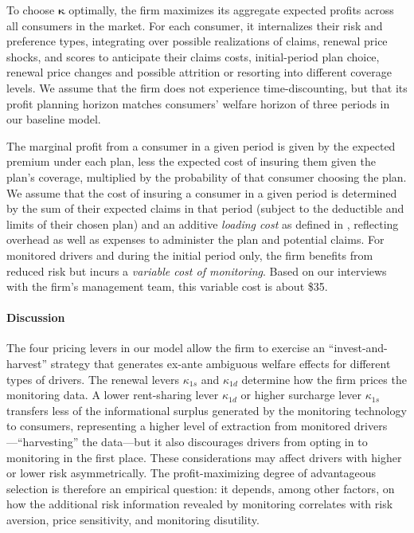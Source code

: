 To choose $\boldsymbol{\kappa}$ optimally, the firm maximizes its aggregate expected profits across all consumers in the market. For each consumer, it internalizes their risk and preference types, integrating over possible realizations of claims, renewal price shocks, and scores to anticipate their claims costs, initial-period plan choice, renewal price changes and possible attrition or resorting into different coverage levels. We assume that the firm does not experience time-discounting, but that its profit planning horizon matches consumers' welfare horizon of three periods in our baseline model.

The marginal profit from a consumer in a given period is given by the expected premium under each plan, less the expected cost of insuring them given the plan's coverage, multiplied by the probability of that consumer choosing the plan. We assume that the cost of insuring a consumer in a given period is determined by the sum of their expected claims in that period (subject to the deductible and limits of their chosen plan) and an additive \textit{loading cost} as defined in , reflecting overhead as well as expenses to administer the plan and potential claims. For monitored drivers and during the initial period only, the firm benefits from reduced risk but incurs a \textit{variable cost of monitoring}. Based on our interviews with the firm's management team, this variable cost is about \$35.

\paragraph{Discussion} The four pricing levers in our model allow the firm to exercise an ``invest-and-harvest'' strategy that generates ex-ante ambiguous welfare effects for different types of drivers. The renewal levers $\kappa_{1s}$ and $\kappa_{1d}$ determine how the firm prices the monitoring {data}. A lower rent-sharing lever $\kappa_{1d}$ or higher surcharge lever $\kappa_{1s}$ transfers less of the informational surplus generated by the monitoring technology to consumers, representing a higher level of extraction from monitored drivers---``harvesting'' the data---but it also discourages drivers from opting in to monitoring in the first place. These considerations may affect drivers with higher or lower risk asymmetrically. The profit-maximizing degree of advantageous selection is therefore an empirical question: it depends, among other factors, on how the additional risk information revealed by monitoring correlates with risk aversion, price sensitivity, and monitoring disutility.

